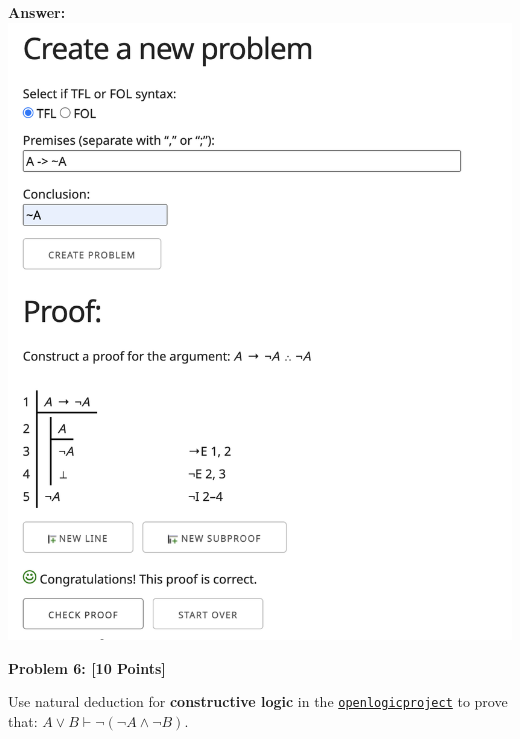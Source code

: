 \documentclass[12pt]{article}
\newcommand{\AND}{\wedge}
\newcommand{\OR}{\vee}
\newcommand{\TURN}{\vdash}
\newcommand{\Problem}[3]{\mbox{} \newline \noindent \textbf{\textbf{Problem #1: #2 [#3 Points] \\ }}}
\begin{document}
\bf{Answer:}
\includegraphics[scale = 0.4]{hw2pr5.png}

\Problem{6}{}{10}

Use natural deduction for \textbf{constructive logic}  in the \href{http://proofs.openlogicproject.org}{\texttt{openlogicproject}} to prove  that:  $A \OR B \TURN \neg( \neg A \AND \neg B)$.
\end{document}
